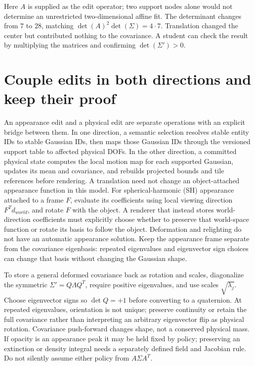 Here \(A\) is supplied as the edit operator; two support nodes alone would not determine an unrestricted two-dimensional affine fit. The determinant changes from \(7\) to \(28\), matching \(\det(A)^2\det(\Sigma)=4\cdot7\). Translation changed the center but contributed nothing to the covariance. A student can check the result by multiplying the matrices and confirming \(\det(\Sigma')>0\).

\section{Couple edits in both directions and keep their proof}\label{04-visual-computing-ii-ch039-couple-edits-in-both-directions-and-keep-their-proof}

\hypertarget{04-visual-computing-ii-ch039-couple-edits-in-both-directions-and-keep-their-proof}{}

An appearance edit and a physical edit are separate operations with an explicit bridge between them. In one direction, a semantic selection resolves stable entity IDs to stable Gaussian IDs, then maps those Gaussian IDs through the versioned support table to affected physical DOFs. In the other direction, a committed physical state computes the local motion map for each supported Gaussian, updates its mean and covariance, and rebuilds projected bounds and tile references before rendering. A translation need not change an object-attached appearance function in this model. For spherical-harmonic (SH) appearance attached to a frame \(F\), evaluate its coefficients using local viewing direction \(F^Td_{world}\), and rotate \(F\) with the object. A renderer that instead stores world-direction coefficients must explicitly choose whether to preserve that world-space function or rotate its basis to follow the object. Deformation and relighting do not have an automatic appearance solution. Keep the appearance frame separate from the covariance eigenbasis: repeated eigenvalues and eigenvector sign choices can change that basis without changing the Gaussian shape.

To store a general deformed covariance back as rotation and scales, diagonalize the symmetric \(\Sigma'=Q\Lambda Q^T\), require positive eigenvalues, and use scales \(\sqrt{\lambda_j}\). Choose eigenvector signs so \(\det Q=+1\) before converting to a quaternion. At repeated eigenvalues, orientation is not unique; preserve continuity or retain the full covariance rather than interpreting an arbitrary eigenvector flip as physical rotation. Covariance push-forward changes shape, not a conserved physical mass. If opacity is an appearance peak it may be held fixed by policy; preserving an extinction or density integral needs a separately defined field and Jacobian rule. Do not silently assume either policy from \(A\Sigma A^T\).

